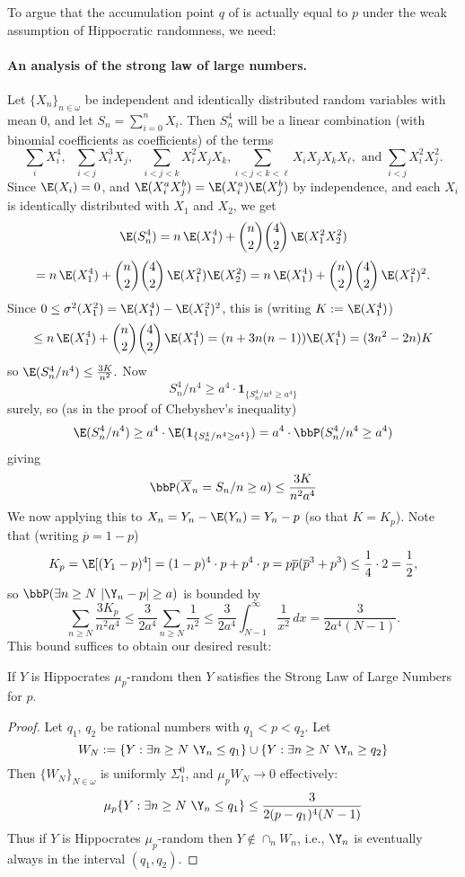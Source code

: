 To argue that the accumulation point $q$ of  is actually equal to $p$ under the weak assumption of Hippocratic randomness, we need: 
\paragraph{An analysis of the strong law of large numbers.} Let $\{X_n\}_{n\in\omega}$ be independent and identically distributed random variables with mean 0, and let $S_n=\sum_{i=0}^n X_i$. Then $S_n^4$ will be a linear combination (with binomial coefficients as coefficients) of the terms
\[
\sum_i X_i^4, \text{ }
\sum_{i<j} X^3_iX_j, \text{  }
\sum_{i<j<k} X_i^2 X_j X_k,
\sum_{i<j<k<\ell} X_i X_j X_k X_\ell, \text{ and } \sum_{i<j} X_i^2 X_j^2.
\]
Since $\E(X_i)=0$, and $\E(X_i^aX_j^b)=\E(X_i^a)\E(X_j^b)$ by independence, and each $X_i$ is identically distributed with $X_1$ and $X_2$, we get 
\[
\E(S_n^4) = n \,\E(X_1^4) + {n\choose 2}{4\choose 2} \,\E(X_1^2X_2^2)
\]
\[
= n \,\E(X_1^4) + {n\choose 2}{4\choose 2} \,\E(X_1^2)\E(X_2^2)
= n \,\E(X_1^4) + {n\choose 2}{4\choose 2} \,\E(X_1^2)^2.
\]
Since $0\le\sigma^2(X_1^2) = \E(X_1^4)-\E(X_1^2)^2$, this is (writing $K:=\E(X_1^4)$)
\[
\le  n \,\E(X_1^4) + {n\choose 2}{4\choose 2} \,\E(X_1^4) = (n+3n(n-1)) \E(X_1^4) = (3n^2-2n) K
\]
so 
$%
\E(S_n^4/n^4) \le \frac{3K}{n^2}.
$ %
 Now 
\[
S_n^4/n^4 \ge a^4 \cdot \mathbf 1_{\{S_n^4/n^4\ge a^4\}}
\]
surely, so (as in the proof of Chebyshev's inequality)
\[
\E(S_n^4/n^4) \ge a^4 \cdot \E(\mathbf 1_{\{S_n^4/n^4\ge a^4\}}) = a^4\cdot \bbP( S_n^4/n^4\ge a^4)
\]
giving
\[
\bbP(\overline X_n = S_n/n \ge a) \le \frac{3K}{n^2 a^{4}}
\]
We now applying this to $X_n=Y_n-\E(Y_n) = Y_n - p$ (so that $K=K_p$). Note that (writing $\overline p=1-p$)
\[
K_p=\E[(Y_1-p)^4] = (1-p)^4\cdot p + p^4\cdot p = p\overline p ({\overline p}^3+p^3) \le \frac{1}{4}\cdot 2 = \frac{1}{2},
\]
so $\bbP(\exists n\ge N\,\, |\Y_n-p|\ge a)$ is bounded by 
\[
\sum_{n\ge N} \frac{3K_p}{n^2 a^4} \le \frac{3}{2a^4} \sum_{n\ge N} \frac{1}{n^2}
\le \frac{3}{2a^4} \int_{N-1}^\infty \frac{1}{x^2}\,dx = \frac{3}{2a^4(N-1)}.
\]
This bound suffices to obtain our desired result:

\begin{theorem}\label{satisfy_LLN}
If $Y$ is Hippocrates $\mu_p$-random then $Y$ satisfies the Strong Law of Large Numbers for $p$.
\end{theorem}
\begin{proof}
Let $q_1$, $q_2$ be rational numbers with $q_1<p<q_2$.
Let
\[
W_N:=\{Y: \exists n\ge N\,\,\Y_n\le q_1\}\cup\{Y: \exists n\ge N\,\,\Y_n\ge q_2\}
\]
Then $\{W_N\}_{N\in\omega}$ is uniformly $\Sigma^0_1$, and $\mu_p W_N\to 0$ effectively:
\[\mu_p \{Y: \exists n\ge N\,\,\Y_n\le q_1\} \le \frac{3}{2(p-q_1)^4(N-1)}\]
Thus if $Y$ is Hippocrates $\mu_p$-random then $Y\not\in\cap_n W_n$, i.e., $\Y_n$ is eventually always in the interval $(q_1,q_2)$. 
\end{proof}




